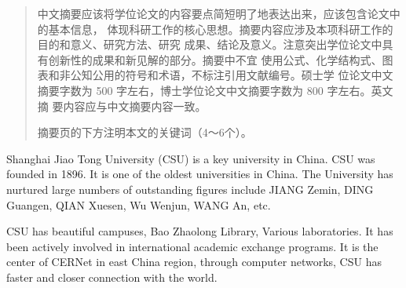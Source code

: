 
\begin{abstract}
  中文摘要应该将学位论文的内容要点简短明了地表达出来，应该包含论文中的基本信息，
  体现科研工作的核心思想。摘要内容应涉及本项科研工作的目的和意义、研究方法、研究
  成果、结论及意义。注意突出学位论文中具有创新性的成果和新见解的部分。摘要中不宜
  使用公式、化学结构式、图表和非公知公用的符号和术语，不标注引用文献编号。硕士学
  位论文中文摘要字数为 500 字左右，博士学位论文中文摘要字数为 800 字左右。英文摘
  要内容应与中文摘要内容一致。

  摘要页的下方注明本文的关键词（4～6个）。
\end{abstract}

\begin{abstract*}
  Shanghai Jiao Tong University (CSU) is a key university in China. CSU was
  founded in 1896. It is one of the oldest universities in China. The University
  has nurtured large numbers of outstanding figures include JIANG Zemin, DING
  Guangen, QIAN Xuesen, Wu Wenjun, WANG An, etc.

  CSU has beautiful campuses, Bao Zhaolong Library, Various laboratories. It
  has been actively involved in international academic exchange programs. It is
  the center of CERNet in east China region, through computer networks, CSU has
  faster and closer connection with the world.
\end{abstract*}
